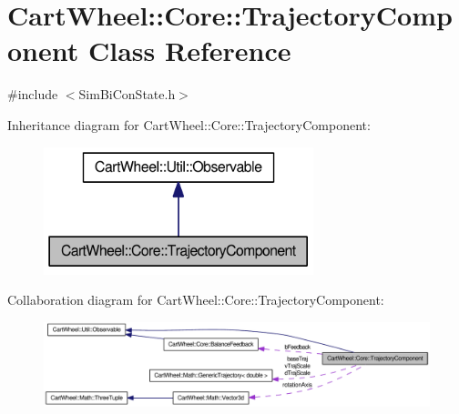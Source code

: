 \hypertarget{classCartWheel_1_1Core_1_1TrajectoryComponent}{
\section{CartWheel::Core::TrajectoryComponent Class Reference}
\label{classCartWheel_1_1Core_1_1TrajectoryComponent}
}


{\ttfamily \#include $<$SimBiConState.h$>$}



Inheritance diagram for CartWheel::Core::TrajectoryComponent:\nopagebreak
\begin{figure}[H]
\begin{center}
\leavevmode
\includegraphics[width=222pt]{classCartWheel_1_1Core_1_1TrajectoryComponent__inherit__graph}
\end{center}
\end{figure}


Collaboration diagram for CartWheel::Core::TrajectoryComponent:\nopagebreak
\begin{figure}[H]
\begin{center}
\leavevmode
\includegraphics[width=400pt]{classCartWheel_1_1Core_1_1TrajectoryComponent__coll__graph}
\end{center}
\end{figure}
